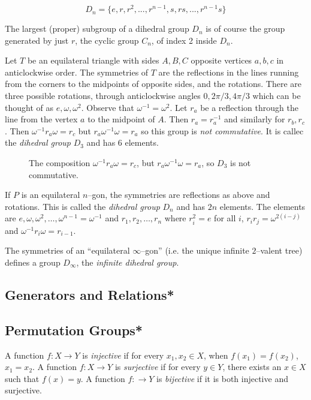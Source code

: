 \begin{equation}
D_n = \{e, r, r^2, ..., r^{n-1}, s, rs, ..., r^{n-1}s\}
\end{equation}

The largest (proper) subgroup of a dihedral group $D_n$ is of course the group generated by just $r$, the cyclic group $C_n$, of index 2 inside $D_n$.

\begin{exa}
	Let $T$ be an equilateral triangle with sides $A,B,C$ opposite vertices $a,b,c$ in anticlockwise
	order. The symmetries of $T$ are the reflections in the
	lines running from the corners to the midpoints of opposite sides, and the rotations.
	There are three possible rotations, through anticlockwise 
	angles $0,2\pi/3,4\pi/3$ which can be thought of
	as $e,\omega,\omega^2$. Observe that $\omega^{-1} = \omega^2$. 
	Let $r_a$ be a reflection through the line from the
	vertex $a$ to the midpoint of $A$. Then $r_a = r_a^{-1}$ and similarly for $r_b,r_c$.
	Then $\omega^{-1}r_a\omega = r_c$ but $r_a\omega^{-1}\omega = r_a$
	so this group is {\em not commutative}. It is callec the {\em dihedral group} $D_3$ and
	has $6$ elements.
\end{exa}

\begin{figure}[ht]

\caption{The composition $\omega^{-1}r_a\omega = r_c$, but $r_a\omega^{-1}\omega = r_a$,
so $D_3$ is not commutative.}
\label{dihedral}
\end{figure}

\begin{exa}
	If $P$ is an equilateral $n$--gon, the symmetries are reflections as above and rotations.
	This is called the {\em dihedral group} $D_n$ and has $2n$ elements. The elements are
	$e,\omega,\omega^2,\dots,\omega^{n-1}=\omega^{-1}$ 
	and $r_1,r_2,\dots,r_n$ where $r_i^2 = e$ for all $i$, $r_ir_j = \omega^{2(i-j)}$ and
	$\omega^{-1}r_i\omega = r_{i-1}$.
\end{exa}

\begin{exa}
	The symmetries of an ``equilateral $\infty$--gon'' (i.e. the unique infinite $2$--valent
	tree) defines a group $D_\infty$, the {\em infinite dihedral group}.
\end{exa}
\subsection{Generators and Relations*}
\subsection{Permutation Groups*}
\begin{defn}
	A function $f: X \rightarrow Y$ is \emph{injective} if for every $x_1, x_2 \in X$, when $f(x_1) = f(x_2)$, $x_1 = x_2$.  A function $f: X \rightarrow Y$ is \emph{surjective} if for every $y \in Y$, there exists an $x \in X$ such that $f(x) = y$.  A function $f: \rightarrow Y$ is \emph{bijective} if it is both injective and surjective.
\end{defn}

